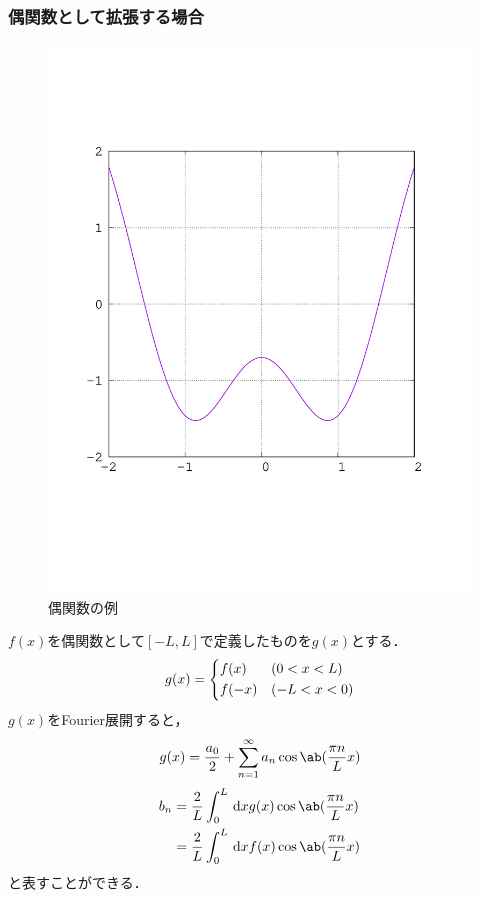 \subsubsection{偶関数として拡張する場合}
\begin{figure}[H]
  \centering
  \includegraphics[width=0.4\linewidth]{fig/even_func.pdf}  
  \caption{偶関数の例}
\end{figure}
$f(x)$を偶関数として$[-L, L]$で定義したものを$g(x)$とする．
\begin{gather}  
  g(x) = 
  \begin{dcases}
    f(x) & (0 < x < L)\\
    f(-x) & (-L<x<0)
  \end{dcases}
\end{gather}
$g(x)$をFourier展開すると，
\begin{gather}
  g(x) = \frac{a_0}{2} + \sum_{n=1}^\infty a_n \cos\ab(\frac{\pi n}{L}x)
\end{gather}
\begin{align}  
  b_n &= \frac{2}{L} \int_0^L \dl{x} g(x) \cos\ab(\frac{\pi n}{L} x)\\
      &= \frac{2}{L} \int_0^L \dl{x} f(x) \cos\ab(\frac{\pi n}{L} x)
\end{align}
と表すことができる．




